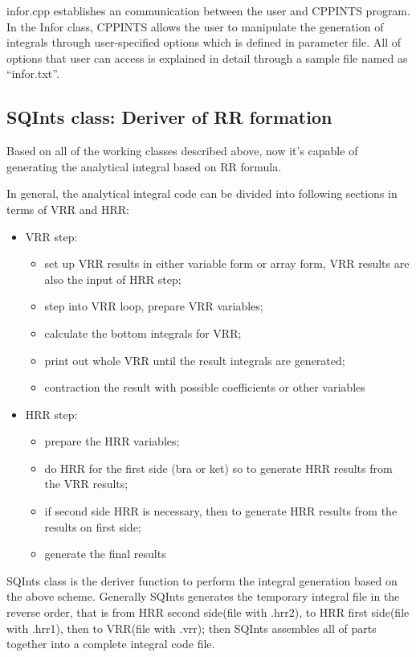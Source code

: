 infor.cpp establishes an communication between the user and CPPINTS
program. In the Infor class, CPPINTS allows the user to manipulate
the generation of integrals through user-specified options which is 
defined in parameter file. All of options that user can access is 
explained in detail through a sample file named as ``infor.txt''. 

\subsection{SQInts class: Deriver of RR formation}

Based on all of the working classes described above, now it's capable of 
generating the analytical integral based on RR formula.

In general, the analytical integral code can be divided into following 
sections in terms of VRR and HRR:
\begin{itemize}
 \item VRR step:
 \begin{itemize}
    \item set up VRR results in either variable form or array form, VRR 
    results are also the input of HRR step;
    \item step into VRR loop, prepare VRR variables;
    \item calculate the bottom integrals for VRR;
    \item print out whole VRR until the result integrals are generated;
    \item contraction the result with possible coefficients or other 
    variables
 \end{itemize}
\item HRR step:
 \begin{itemize}
    \item prepare the HRR variables;
    \item do HRR for the first side (bra or ket) so to generate HRR results
    from the VRR results;
    \item if second side HRR is necessary, then to generate HRR results 
    from the results on first side;
    \item generate the final results
 \end{itemize}
\end{itemize}

SQInts class is the deriver function to perform the integral generation based
on the above scheme. Generally SQInts generates the temporary integral file 
in the reverse order, that is from HRR second side(file with .hrr2), to HRR 
first side(file with .hrr1), then to VRR(file with .vrr); then SQInts 
assembles all of parts together into a complete integral code file.

